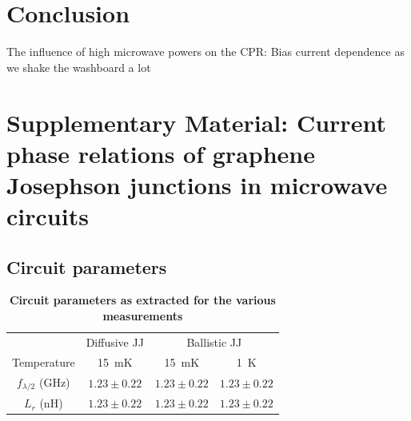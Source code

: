 \section{Conclusion}

The influence of high microwave powers on the CPR: Bias current dependence as we shake the washboard a lot


\pagebreak
\clearpage



\section{Supplementary Material: Current phase relations of graphene Josephson junctions in microwave circuits}

\subsection{Circuit parameters}

\begin{table}
	\centering
	\caption{\textbf{Circuit parameters as extracted for the various measurements}}
	\begin{tabular}{cccc}
		\hline\hline
		& Diffusive JJ & \multicolumn{2}{c}{Ballistic JJ}  \\
		Temperature & \SI{15}{\milli\kelvin} & \SI{15}{\milli\kelvin} & \SI{1}{\kelvin} \\
		\hline
		$f_{\lambda/2}$ (\si{\giga\hertz}) & $1.23\pm0.22$ & $1.23\pm0.22$ & $1.23\pm0.22$ \\
		$L_r$ (\si{\nano\henry}) & $1.23\pm0.22$ & $1.23\pm0.22$ & $1.23\pm0.22$ \\
		\hline\hline
	\end{tabular}
	\label{tab:frLr}
\end{table}

